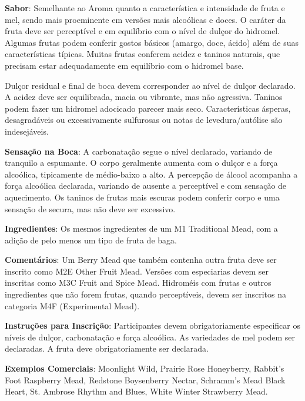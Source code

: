 \textbf{Sabor}: Semelhante ao Aroma quanto a característica e intensidade de fruta e mel, sendo mais proeminente em versões mais alcoólicas e doces. O caráter da fruta deve ser perceptível e em equilíbrio com o nível de dulçor do hidromel. Algumas frutas podem conferir gostos básicos (amargo, doce, ácido) além de suas características típicas. Muitas frutas conferem acidez e taninos naturais, que precisam estar adequadamente em equilíbrio com o hidromel base.

Dulçor residual e final de boca devem corresponder ao nível de dulçor declarado. A acidez deve ser equilibrada, macia ou vibrante, mas não agressiva. Taninos podem fazer um hidromel adocicado parecer mais seco. Características ásperas, desagradáveis ou excessivamente sulfurosas ou notas de levedura/autólise são indesejáveis.

\textbf{Sensação na Boca}: A carbonatação segue o nível declarado, variando de tranquilo a espumante. O corpo geralmente aumenta com o dulçor e a força alcoólica, tipicamente de médio-baixo a alto. A percepção de álcool acompanha a força alcoólica declarada, variando de ausente a perceptível e com sensação de aquecimento. Os taninos de frutas mais escuras podem conferir corpo e uma sensação de secura, mas não deve ser excessivo.

\textbf{Ingredientes}: Os mesmos ingredientes de um M1 Traditional Mead, com a adição de pelo menos um tipo de fruta de baga.

\textbf{Comentários}: Um Berry Mead que também contenha outra fruta deve ser inscrito como M2E Other Fruit Mead. Versões com especiarias devem ser inscritas como M3C Fruit and Spice Mead. Hidroméis com frutas e outros ingredientes que não forem frutas, quando perceptíveis, devem ser inscritos na categoria M4F (Experimental Mead).

\textbf{Instruções para Inscrição}: Participantes devem obrigatoriamente especificar os níveis de dulçor, carbonatação e força alcoólica. As variedades de mel podem ser declaradas. A fruta deve obrigatoriamente ser declarada.

\textbf{Exemplos Comerciais}: Moonlight Wild, Prairie Rose Honeyberry, Rabbit's Foot Raspberry Mead, Redstone Boysenberry Nectar, Schramm's Mead Black Heart, St. Ambrose Rhythm and Blues, White Winter Strawberry Mead.
